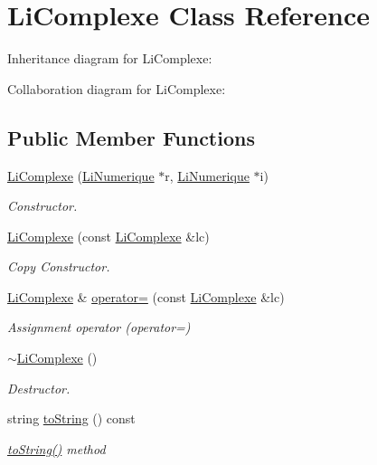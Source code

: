 \hypertarget{class_li_complexe}{}\section{Li\+Complexe Class Reference}
\label{class_li_complexe}


Inheritance diagram for Li\+Complexe\+:


Collaboration diagram for Li\+Complexe\+:
\subsection*{Public Member Functions}
\begin{DoxyCompactItemize}
\item 
\hyperlink{class_li_complexe_a0681209fab64a65ed4da984218b3abfd}{Li\+Complexe} (\hyperlink{class_li_numerique}{Li\+Numerique} $\ast$r, \hyperlink{class_li_numerique}{Li\+Numerique} $\ast$i)
\begin{DoxyCompactList}\small\item\em Constructor. \end{DoxyCompactList}\item 
\hyperlink{class_li_complexe_a7acf3c859eca3cf2a8e6d81c05aa49d4}{Li\+Complexe} (const \hyperlink{class_li_complexe}{Li\+Complexe} \&lc)
\begin{DoxyCompactList}\small\item\em Copy Constructor. \end{DoxyCompactList}\item 
\hyperlink{class_li_complexe}{Li\+Complexe} \& \hyperlink{class_li_complexe_a5183c5901d1582f325b7f02f1b4f0198}{operator=} (const \hyperlink{class_li_complexe}{Li\+Complexe} \&lc)
\begin{DoxyCompactList}\small\item\em Assignment operator (operator=) \end{DoxyCompactList}\item 
\hyperlink{class_li_complexe_a56e0f48b9815525913fcf136e51ac39d}{$\sim$\+Li\+Complexe} ()
\begin{DoxyCompactList}\small\item\em Destructor. \end{DoxyCompactList}\item 
string \hyperlink{class_li_complexe_a5490d27f24fd273c8a3f5cc28e22d6d8}{to\+String} () const 
\begin{DoxyCompactList}\small\item\em \hyperlink{class_li_complexe_a5490d27f24fd273c8a3f5cc28e22d6d8}{to\+String()} method \end{DoxyCompactList}\item 

\end{DoxyCompactItemize}
